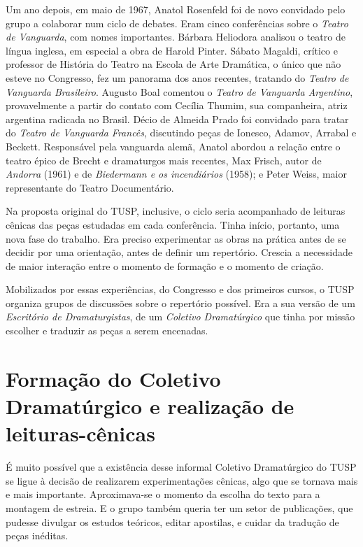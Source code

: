 Um ano depois, em maio de 1967, Anatol Rosenfeld foi de novo convidado
pelo grupo a colaborar num ciclo de debates. Eram cinco conferências
sobre o \textit{Teatro de Vanguarda}, com nomes importantes. Bárbara
Heliodora analisou o teatro de língua inglesa, em especial a obra de
Harold Pinter. Sábato Magaldi, crítico e professor de História do Teatro
na Escola de Arte Dramática, o único que não esteve no Congresso, fez um
panorama dos anos recentes, tratando do \textit{Teatro de Vanguarda
Brasileiro}. Augusto Boal comentou o \textit{Teatro de Vanguarda
Argentino}, provavelmente a partir do contato com Cecília Thumim, sua
companheira, atriz argentina radicada no Brasil. Décio de Almeida Prado
foi convidado para tratar do \textit{Teatro de Vanguarda Francês},
discutindo peças de Ionesco, Adamov, Arrabal e Beckett. Responsável pela
vanguarda alemã, Anatol abordou a relação entre o teatro épico de Brecht
e dramaturgos mais recentes, Max Frisch, autor de \textit{Andorra} (1961) e
de \textit{Biedermann e os incendiários} (1958); e Peter Weiss, maior
representante do Teatro Documentário.

Na proposta original do TUSP, inclusive, o ciclo seria acompanhado de
leituras cênicas das peças estudadas em cada conferência. Tinha início,
portanto, uma nova fase do trabalho. Era preciso experimentar as obras
na prática antes de se decidir por uma orientação, antes de definir um
repertório. Crescia a necessidade de maior interação entre o momento de
formação e o momento de criação.

Mobilizados por essas experiências, do Congresso e dos primeiros cursos,
o TUSP organiza grupos de discussões sobre o repertório possível. Era a
sua versão de um \textit{Escritório de Dramaturgistas}, de um \textit{Coletivo
Dramatúrgico} que tinha por missão escolher e traduzir as peças a serem
encenadas.

\section{Formação do Coletivo Dramatúrgico e realização de leituras-cênicas}

É muito possível que a existência desse informal Coletivo Dramatúrgico
do TUSP se ligue à decisão de realizarem experimentações cênicas, algo
que se tornava mais e mais importante. Aproximava-se o momento da
escolha do texto para a montagem de estreia. E o grupo também queria ter
um setor de publicações, que pudesse divulgar os estudos teóricos,
editar apostilas, e cuidar da tradução de peças inéditas.

